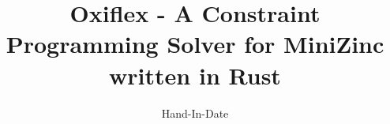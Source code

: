\documentclass[a4paper, 10pt, oneside]{memoir}
\title				{Oxiflex - A Constraint Programming Solver for MiniZinc written in Rust}
\date				{Hand-In-Date}
\begin{document}

\thesisfront
\maketitle
\pagestyle{thesis}
% 

\thesistoc
\thesismain





\thesisappendix
\thesisbib
\begin{appendices}
	
\end{appendices}
\thesisback
{}
{}
{}
\end{document}
